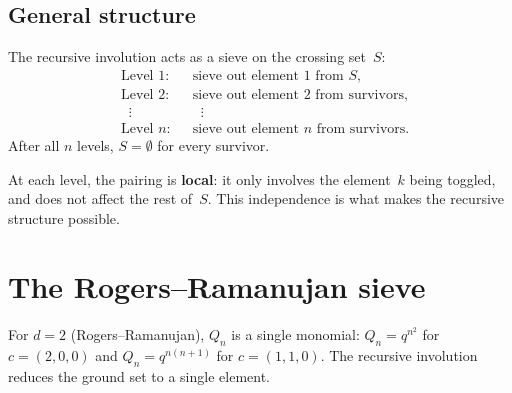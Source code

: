 \documentclass[11pt]{article}
\theoremstyle{plain}
\theoremstyle{definition}
\begin{document}
\subsection{General structure}

The recursive involution acts as a sieve on the crossing
set~$S$:
\begin{align*}
  &\text{Level~$1$:} &
    &\text{sieve out element~$1$ from } S, \\
  &\text{Level~$2$:} &
    &\text{sieve out element~$2$ from survivors}, \\
  &\;\;\vdots & &\;\;\vdots \\
  &\text{Level~$n$:} &
    &\text{sieve out element~$n$ from survivors}.
\end{align*}
After all $n$ levels, $S = \emptyset$ for every survivor.

At each level, the pairing is \textbf{local}: it only
involves the element~$k$ being toggled, and does not
affect the rest of~$S$.  This independence is what makes
the recursive structure possible.


\section{The Rogers--Ramanujan sieve}
\label{sec:RR-sieve}

For $d = 2$ (Rogers--Ramanujan), $Q_n$ is a single
monomial: $Q_n = q^{n^2}$ for $c = (2,0,0)$ and
$Q_n = q^{n(n+1)}$ for $c = (1,1,0)$.  The recursive
involution reduces the ground set to a single element.
\end{document}
